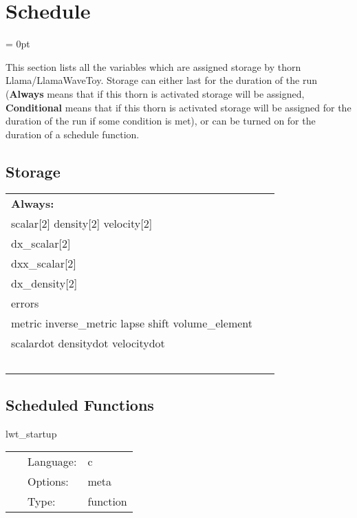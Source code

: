 
\section{Schedule} 


\parskip = 0pt


\noindent This section lists all the variables which are assigned storage by thorn Llama/LlamaWaveToy.  Storage can either last for the duration of the run ({\bf Always} means that if this thorn is activated storage will be assigned, {\bf Conditional} means that if this thorn is activated storage will be assigned for the duration of the run if some condition is met), or can be turned on for the duration of a schedule function.


\subsection*{Storage}

\hspace{5mm}

 \begin{tabular*}{160mm}{ll} 

{\bf Always:}&  ~ \\ 
 scalar[2] density[2] velocity[2] & ~\\ 
 dx\_scalar[2] & ~\\ 
 dxx\_scalar[2] & ~\\ 
 dx\_density[2] & ~\\ 
 errors & ~\\ 
 metric inverse\_metric lapse shift volume\_element & ~\\ 
 scalardot densitydot velocitydot & ~\\ 
~ & ~\\ 
\end{tabular*} 


\subsection*{Scheduled Functions}
\vspace{5mm}


\hspace{5mm} lwt\_startup 

\hspace{5mm}{\it register banner with cactus } 


\hspace{5mm}

 \begin{tabular*}{160mm}{cll} 
~ & Language:  & c \\ 
~ & Options:  & meta \\ 
~ & Type:  & function \\ 
\end{tabular*} 


